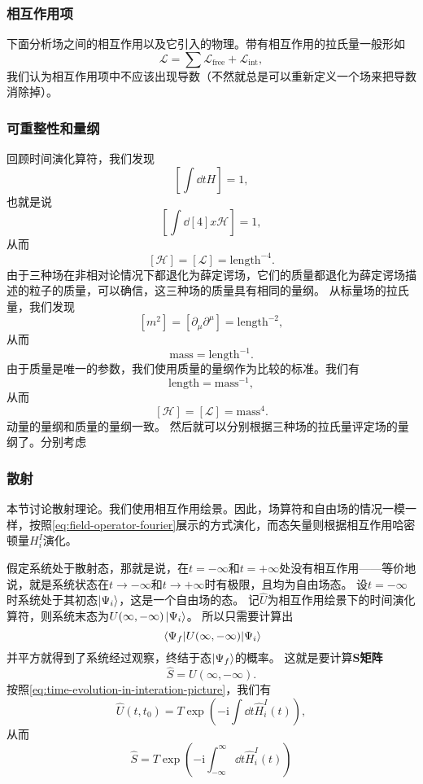 \documentclass[hyperref, UTF8, a4paper]{ctexart}
\newcommand*{\ii}{\mathrm{i}}
\begin{document}

\subsubsection{相互作用项}

下面分析场之间的相互作用以及它引入的物理。带有相互作用的拉氏量一般形如
\begin{equation}
    \mathcal{L} = \sum \mathcal{L}_\text{free} + \mathcal{L}_\text{int},
\end{equation}
我们认为相互作用项中不应该出现导数（不然就总是可以重新定义一个场来把导数消除掉）。

\subsubsection{可重整性和量纲}

回顾时间演化算符，我们发现
\[
    \left[ \int \dd{t} H \right] = 1,
\]
也就是说
\[
    \left[ \int \dd[4]{x} \mathcal{H} \right] = 1,
\]
从而
\[
    [\mathcal{H}] = [\mathcal{L}] = \text{length}^{-4}.
\]
由于三种场在非相对论情况下都退化为薛定谔场，它们的质量都退化为薛定谔场描述的粒子的质量，可以确信，这三种场的质量具有相同的量纲。
从标量场的拉氏量，我们发现
\[
    [m^2] = [\partial_\mu \partial^\mu] = \text{length}^{-2},
\]
从而
\[
    \text{mass} = \text{length}^{-1}.
\]
由于质量是唯一的参数，我们使用质量的量纲作为比较的标准。我们有
\[
    \text{length} = \text{mass}^{-1},
\]
从而
\[
    [\mathcal{H}] = [\mathcal{L}] = \text{mass}^4.
\]
动量的量纲和质量的量纲一致。
然后就可以分别根据三种场的拉氏量评定场的量纲了。分别考虑

\subsubsection{散射}

本节讨论散射理论。我们使用相互作用绘景。因此，场算符和自由场的情况一模一样，按照\eqref{eq:field-operator-fourier}展示的方式演化，而态矢量则根据相互作用哈密顿量$H_i^I$演化。

假定系统处于散射态，那就是说，在$t=-\infty$和$t=+\infty$处没有相互作用——等价地说，就是系统状态在$t \to -\infty$和$t \to +\infty$时有极限，且均为自由场态。
设$t = -\infty$时系统处于其初态$\ket{\Psi_i}$，这是一个自由场的态。
记$\hat{U}$为相互作用绘景下的时间演化算符，则系统末态为$U(\infty, -\infty) \ket{\Psi_i}$。
所以只需要计算出
\[
    \mel{\Psi_f}{U(\infty, -\infty)}{\Psi_i}
\]
并平方就得到了系统经过观察，终结于态$\ket{\Psi_f}$的概率。
这就是要计算\textbf{S矩阵}
\begin{equation}
    \hat{S} = U(\infty, -\infty).
\end{equation}
按照\eqref{eq:time-evolution-in-interation-picture}，我们有
\[
    \hat{U}(t, t_0) = T \exp \left( - \ii \int \dd{t} \hat{H}_i^I(t) \right),
\]
从而
\begin{equation}
    \hat{S} = T \exp \left( - \ii \int_{-\infty}^\infty \dd{t} \hat{H}_i^I(t) \right)
\end{equation}
\end{document}
